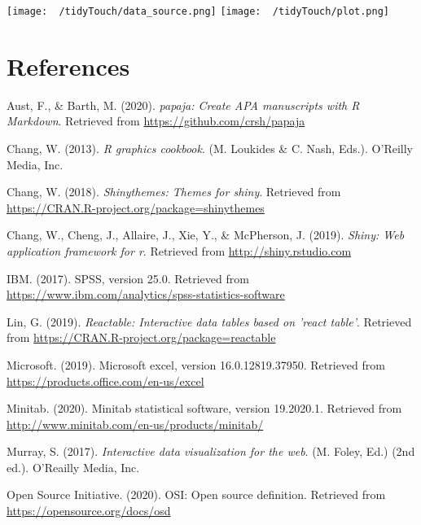 \documentclass[english,man,floatsintext]{apa6}
\begin{document}
\texttt{[image: ~/tidyTouch/data\_source.png]}
\newpage
\texttt{[image: ~/tidyTouch/plot.png]}

\newpage

\hypertarget{references}{%
\section{References}\label{references}}

\begingroup
\setlength{\parindent}{-0.5in}
\setlength{\leftskip}{0.5in}

\hypertarget{refs}{}
\leavevmode\hypertarget{ref-R-papaja}{}%
Aust, F., \& Barth, M. (2020). \emph{papaja: Create APA manuscripts with R Markdown}. Retrieved from \url{https://github.com/crsh/papaja}

\leavevmode\hypertarget{ref-cook-graphs}{}%
Chang, W. (2013). \emph{R graphics cookbook}. (M. Loukides \& C. Nash, Eds.). O'Reilly Media, Inc.

\leavevmode\hypertarget{ref-R-shinythemes}{}%
Chang, W. (2018). \emph{Shinythemes: Themes for shiny}. Retrieved from \url{https://CRAN.R-project.org/package=shinythemes}

\leavevmode\hypertarget{ref-R-shiny}{}%
Chang, W., Cheng, J., Allaire, J., Xie, Y., \& McPherson, J. (2019). \emph{Shiny: Web application framework for r}. Retrieved from \url{http://shiny.rstudio.com}

\leavevmode\hypertarget{ref-spss}{}%
IBM. (2017). SPSS, version 25.0. Retrieved from \url{https://www.ibm.com/analytics/spss-statistics-software}

\leavevmode\hypertarget{ref-R-reactable}{}%
Lin, G. (2019). \emph{Reactable: Interactive data tables based on 'react table'}. Retrieved from \url{https://CRAN.R-project.org/package=reactable}

\leavevmode\hypertarget{ref-excel}{}%
Microsoft. (2019). Microsoft excel, version 16.0.12819.37950. Retrieved from \url{https://products.office.com/en-us/excel}

\leavevmode\hypertarget{ref-minitab}{}%
Minitab. (2020). Minitab statistical software, version 19.2020.1. Retrieved from \url{http://www.minitab.com/en-us/products/minitab/}

\leavevmode\hypertarget{ref-datavis1}{}%
Murray, S. (2017). \emph{Interactive data visualization for the web}. (M. Foley, Ed.) (2nd ed.). O'Reailly Media, Inc.

\leavevmode\hypertarget{ref-osd}{}%
Open Source Initiative. (2020). OSI: Open source definition. Retrieved from \url{https://opensource.org/docs/osd}
\end{document}
